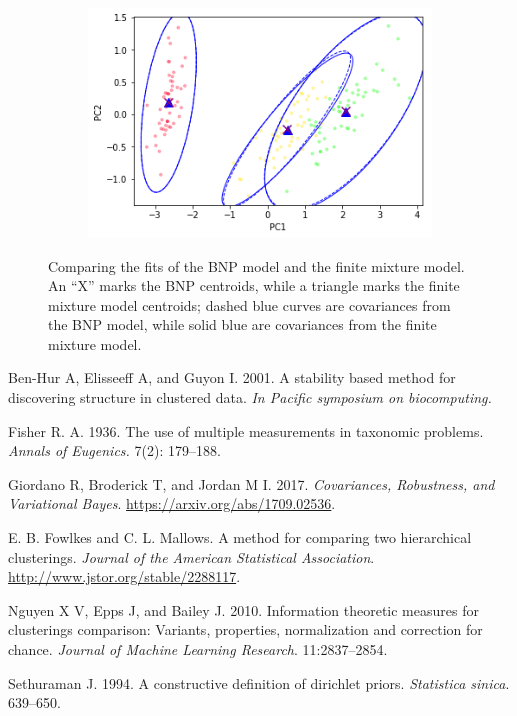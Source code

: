 \documentclass[a4paper]{article}
\begin{document}
\begin{figure}[h!]
	\centering
  \begin{subfigure}[t]{0.4\textwidth}
		\includegraphics[width = \textwidth]{./finite_mixture_figures/bnp_vs_fin_centroids.png}
	\end{subfigure}
	\caption{Comparing the fits of the BNP model and the finite mixture model. An ``X'' marks the
	BNP centroids, while a triangle marks the finite mixture model centroids;
	dashed blue curves are covariances from the BNP model, while
	solid blue are covariances from the finite mixture model.  }
  \label{fig:cluster_centroids}
\end{figure}



\begin{thebibliography}{9}
Ben-Hur A, Elisseeff A, and Guyon I. 2001. A stability based method for discovering structure
in clustered data. \textit{In Pacific symposium on biocomputing.}

Fisher R. A. 1936. The use of multiple measurements in taxonomic problems.
\textit{Annals of Eugenics.} 7(2): 179–188.

Giordano R, Broderick T, and Jordan  M I. 2017.
\textit{Covariances, Robustness, and Variational Bayes}.
\url{https://arxiv.org/abs/1709.02536}.

E. B. Fowlkes and C. L. Mallows. A method for comparing two hierarchical clusterings.
\textit{Journal of the American Statistical Association}.
\url{http://www.jstor.org/stable/2288117}.

Nguyen X V, Epps J, and Bailey J. 2010. Information theoretic measures for clusterings
comparison: Variants, properties, normalization and correction for chance.
\textit{Journal of Machine Learning Research}. 11:2837–2854.

Sethuraman J. 1994. A constructive definition of dirichlet priors.
\textit{Statistica sinica}. 639–650.

\end{thebibliography}
\end{document}
